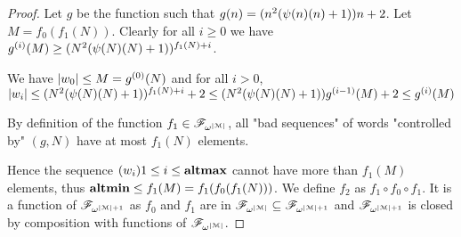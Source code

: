 \begin{proof}
	Let $g$ be the function such that $g(n) = (n^2(\psi(n)(n)+1))n+2$. 
	Let $M = f_0(f_1(N))$. Clearly for all $i\geq 0$ we have $g^{(i)}(M) \geq (N^2(\psi(N)(N)+1))^{f_1(N) + i}$.
	
	We have $|w_0| \leq M = g^{(0)}(N)$ and for all $i>0$, $|w_i| \leq (N^2(\psi(N)(N)+1))^{f_1(N) + i} + 2 \leq (N^2(\psi(N)(N)+1)) g^{(i-1)}(M) + 2 \leq g^{(i)}(M)$
	
	By definition of the function $f_1 \in \mathscr{F}_{\omega^{|\mathcal{M}|}}$, all "bad sequences" of words "controlled by" $(g,N)$ have at most $f_1(N)$ elements.
	
	Hence the sequence $(w_i){1\leq i \leq \mathbf{altmax}}$ cannot have more than $f_1(M)$ elements, thus $\mathbf{altmin} \leq f_1(M) = f_1(f_0(f_1(N)))$.
	We define $f_2$ as $f_1 \circ f_0 \circ f_1$. It is a function of $\mathscr{F}_{\omega^{|\mathcal{M}|+1}}$ as $f_0$ and $f_1$ are in $\mathscr{F}_{\omega^{|\mathcal{M}|}} \subseteq \mathscr{F}_{\omega^{|\mathcal{M}|+1}}$ and $\mathscr{F}_{\omega^{|\mathcal{M}|+1}}$ is closed by composition with functions of $\mathscr{F}_{\omega^{|\mathcal{M}|}}$.
\end{proof}

\PropBoundTreeSize*

